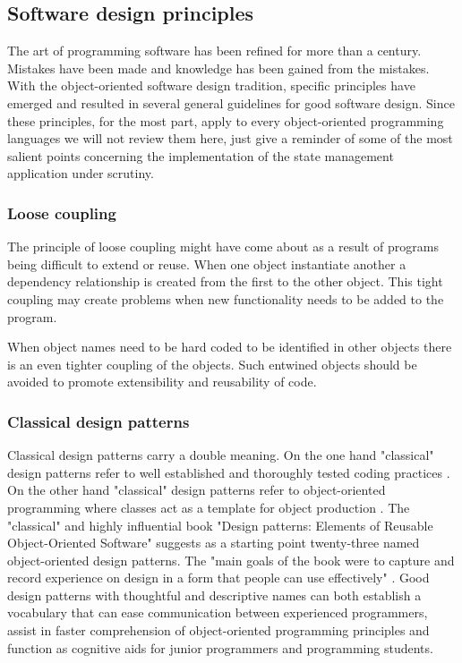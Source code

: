 \documentclass[english]{ifimaster}
\begin{document}
\subsection{Software design principles}
\label{sec:designPrinciples}
The art of programming software has been refined for more than a century. Mistakes have been made and knowledge has been gained from the mistakes. With the object-oriented software design tradition, specific principles have emerged and resulted in several general guidelines for good software design. Since these principles, for the most part, apply to every object-oriented programming languages we will not review them here, just give a reminder of some of the most salient points concerning the implementation of the state management application under scrutiny.

\subsubsection {Loose coupling}
The principle of loose coupling might have come about as a result of programs being difficult to extend or reuse. When one object instantiate another a dependency relationship is created from the first to the other object. This tight coupling may create problems when new functionality needs to be added to the program. 

When object names need to be hard coded to be identified in other objects there is an even tighter coupling of the objects. Such entwined objects should be avoided to promote extensibility and reusability of code.


\subsubsection{Classical design patterns}
Classical design patterns carry a double meaning. On the one hand "classical" design patterns refer to well established and thoroughly tested coding practices \parencite[p. 12]{gamma}. On the other hand "classical" design patterns refer to object-oriented programming where classes act as a template for object production \parencite[p. 115]{stefanov}. The "classical" and highly influential book "Design patterns: Elements of Reusable Object-Oriented Software" suggests as a starting point twenty-three named object-oriented design patterns. The "main goals of the book were to capture and record experience on design in a form that people can use effectively" \parencite[p. 12]{gamma}. Good design patterns with thoughtful and descriptive names can both establish a vocabulary that can ease communication between experienced programmers, assist in faster comprehension of object-oriented programming principles and function as cognitive aids for junior programmers and programming students.
\end{document}
